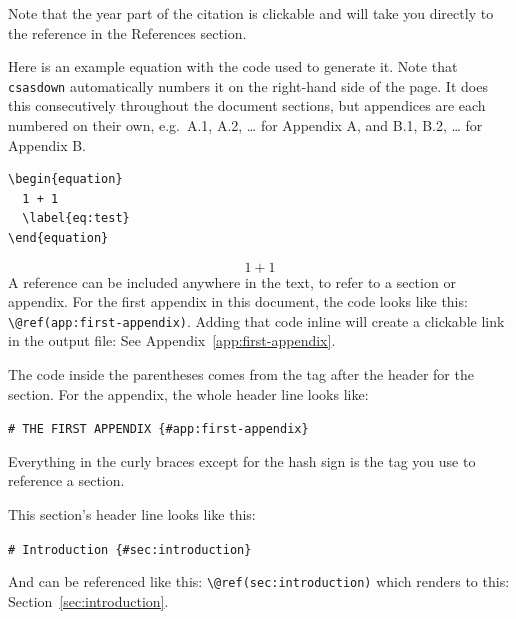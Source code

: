 \documentclass[12pt]{article}\usepackage[]{graphicx}\usepackage[]{color}
\begin{document}
Note that the year part of the citation is clickable and will take you directly to the reference in the References section.

Here is an example equation with the code used to generate it. Note that \texttt{csasdown} automatically numbers it on the right-hand side of the page. It does this consecutively throughout the document sections, but appendices are each numbered on their own, e.g.~A.1, A.2, \ldots{} for Appendix A, and B.1, B.2, \ldots{} for Appendix B.
\begin{verbatim}
\begin{equation}
  1 + 1
  \label{eq:test}
\end{equation}
\end{verbatim}
\begin{equation}
  1 + 1
  \label{eq:test}
\end{equation}
A reference can be included anywhere in the text, to refer to a section or appendix. For the first appendix in this document, the code looks like this: \texttt{\textbackslash{}@ref(app:first-appendix)}. Adding that code inline will create a clickable link in the output file: See Appendix~\ref{app:first-appendix}.

The code inside the parentheses comes from the tag after the header for the section. For the appendix, the whole header line looks like:

\texttt{\#\ THE\ FIRST\ APPENDIX\ \{\#app:first-appendix\}}

Everything in the curly braces except for the hash sign is the tag you use to reference a section.

This section's header line looks like this:

\texttt{\#\ Introduction\ \{\#sec:introduction\}}

And can be referenced like this: \texttt{\textbackslash{}@ref(sec:introduction)} which renders to this: Section~\ref{sec:introduction}.
\end{document}
